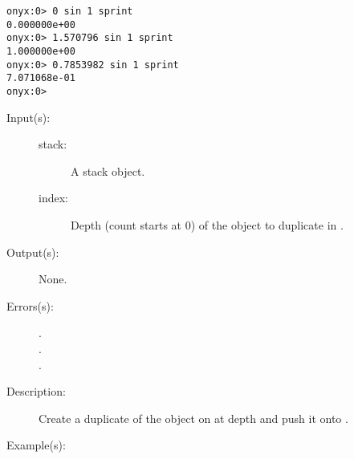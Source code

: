 \begin{description}
\begin{description}
\begin{verbatim}
onyx:0> 0 sin 1 sprint
0.000000e+00
onyx:0> 1.570796 sin 1 sprint
1.000000e+00
onyx:0> 0.7853982 sin 1 sprint
7.071068e-01
onyx:0>
		\end{verbatim}
	\end{description}
\label{systemdict:sindex}
\item[{\onyxop{stack index}{sindex}{--}}: ]
	\begin{description}\item[]
	\item[Input(s): ]
		\begin{description}\item[]
		\item[stack: ]
			A stack object.
		\item[index: ]
			Depth (count starts at 0) of the object to duplicate in
			.
		\end{description}
	\item[Output(s): ] None.
	\item[Errors(s): ]
		\begin{description}\item[]
		\item[.]
		\item[.]
		\item[.]
		\end{description}
	\item[Description: ]
		Create a duplicate of the object on  at depth
		 and push it onto .
	\item[Example(s): ]\begin{verbatim}


\end{verbatim}
\end{description}
\end{description}
